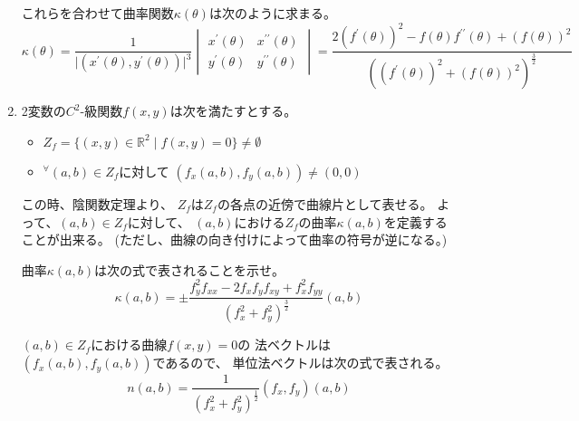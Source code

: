 \documentclass[12pt,b5paper]{ltjsarticle}
\begin{document}
\begin{enumerate}
      これらを合わせて曲率関数$\kappa(\theta)$は次のように求まる。
      \begin{equation}
       \kappa(\theta) = \frac{1}{\lvert (x^{\prime}(\theta),y^{\prime}(\theta)) \rvert^3}
        \begin{vmatrix}
        x^{\prime}(\theta) & x^{\prime\prime}(\theta)\\
        y^{\prime}(\theta) & y^{\prime\prime}(\theta)
        \end{vmatrix}
        =\frac{2(f^{\prime}(\theta))^2 - f(\theta)f^{\prime\prime}(\theta) + (f(\theta))^2}{((f^{\prime}(\theta))^2 + (f(\theta))^2)^{\frac{3}{2}}}
      \end{equation}

\hrulefill


 \item
      2変数の$C^2$-級関数$f(x,y)$は次を満たすとする。
      \begin{itemize}
       \item
            $Z_{f} = \{ (x,y)\in\mathbb{R}^2 \mid f(x,y)=0 \} \ne \emptyset$
       \item
            ${}^{\forall}(a,b)\in Z_{f}$に対して
            $(f_{x}(a,b),f_{y}(a,b))\ne (0,0)$
      \end{itemize}

      この時、陰関数定理より、
      $Z_f$は$Z_f$の各点の近傍で曲線片として表せる。
      よって、$(a,b)\in Z_f$に対して、
      $(a,b)$における$Z_f$の曲率$\kappa(a,b)$を定義することが出来る。
      (ただし、曲線の向き付けによって曲率の符号が逆になる。)

      曲率$\kappa(a,b)$は次の式で表されることを示せ。
      \begin{equation}
       \kappa(a,b)=
        \pm \frac{f_y^2f_{xx}-2f_xf_yf_{xy}+f_x^2f_{yy}}{(f_x^2+f_y^2)^{\frac{3}{2}}}(a,b)
      \end{equation}

\dotfill






      $(a,b)\in Z_{f}$における曲線$f(x,y)=0$の
      法ベクトルは$(f_{x}(a,b),f_{y}(a,b))$であるので、
      単位法ベクトルは次の式で表される。
      \begin{equation}
       n(a,b)
        = \frac{1}{(f_{x}^2+f_{y}^2)^\frac{1}{2}}(f_{x},f_{y})(a,b)
        \label{unitn}
      \end{equation}


\end{enumerate}
\end{document}
